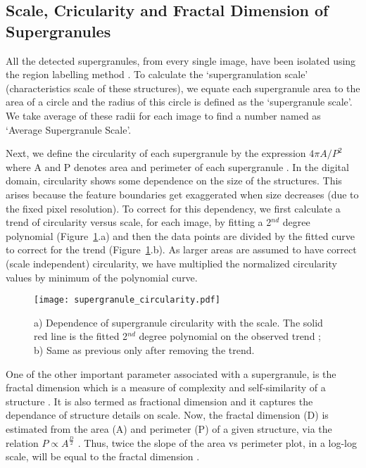 \documentclass[manuscript]{aastex}	%
\begin{document}
   \subsection{Scale, Cricularity and Fractal Dimension of Supergranules}\label{sec:fractal}

               All the detected supergranules, from every single image, have been isolated using the region labelling method \citep{sonka2014image}. To calculate the `supergranulation scale' (characteristics scale of these structures), we equate each supergranule area to the area of a circle and the radius of this circle is defined as the `supergranule scale'. We take average of these radii for each image to find a number named as `Average Supergranule Scale'.

Next, we define the circularity of each supergranule by the expression ${4\pi A}/{P^{2}}$ where A and P denotes area and perimeter of each supergranule \citep{0004-637X-534-2-1008}. In the digital domain, circularity shows some dependence on the size of the structures. This arises because the feature boundaries get exaggerated when size decreases (due to the fixed pixel resolution). To correct for this dependency, we first calculate a trend of circularity versus scale, for each image, by fitting a 2$^{nd}$ degree polynomial (Figure~\ref{fig:circ}.a) and then the data points are divided by the fitted curve to correct for the trend (Figure~\ref{fig:circ}.b). As larger areas are assumed to have correct (scale independent) circularity, we have multiplied the normalized circularity values by minimum of the polynomial curve. 
\begin{figure}[!htb]
\centering
  \texttt{[image: supergranule\_circularity.pdf]}
  \caption{ a) Dependence of supergranule circularity with the scale. The solid red line is the fitted 2$^{nd}$ degree polynomial on the observed trend ; b) Same as previous only after removing the trend. }
 \label{fig:circ}
\end{figure}

One of the other important parameter associated with a supergranule, is the fractal dimension which is a measure of complexity and self-similarity of a structure \citep{mandelbrot1982fractal}. It is also termed as fractional dimension and it captures the dependance of structure details on scale. Now, the fractal dimension (D) is estimated from the area (A) and perimeter (P) of a given structure, via the relation $P \propto A^{\frac{D}{2}}$ \citep{Muller1994}. Thus, twice the slope of the area vs perimeter plot, in a log-log scale, will be equal to the fractal dimension \citep{Paniveni11022010}. 
\end{document}

